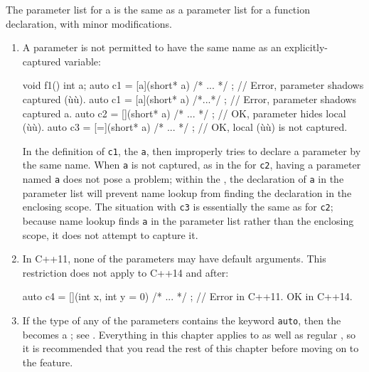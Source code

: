 \noindent The parameter list for a  is the same as a
parameter list for a function declaration, with minor modifications.

\begin{enumerate}
\item{A parameter is not permitted to have the same name as an explicitly-captured variable:

\begin{emcppslisting}
void f1()
{
    int a;
    auto c1 = [a](short* a){ /* ... */ };  // Error, parameter shadows captured (ù{}ù).
    auto c1 = [a](short* a){ /*...*/ };  // Error, parameter shadows captured a.
    auto c2 = [](short* a){ /* ... */ };   // OK, parameter hides local (ù{}ù).
    auto c3 = [=](short* a){ /* ... */ };  // OK, local (ù{}ù) is not captured.
}
\end{emcppslisting}

\noindent In the definition of \lstinline!c1!, the 
 \lstinline!a!, then improperly tries to
declare a parameter by the same name. When \lstinline!a! is not captured,
as in the  for \lstinline!c2!, having a parameter
named \lstinline!a! does not pose a problem; within the , the declaration of \lstinline!a! in the parameter list will prevent
name lookup from finding the declaration in the enclosing scope. The
situation with \lstinline!c3! is essentially the same as for \lstinline!c2!;
because name lookup finds \lstinline!a! in the parameter list rather than
the enclosing scope, it does not attempt to capture it.}

\item{In C++11, none of the parameters may have default arguments. This restriction does not apply to C++14 and after:

\begin{emcppslisting}
auto c4 = [](int x, int y = 0){ /* ... */ };  // Error in C++11.  OK in C++14.
\end{emcppslisting}
}

\item{If the type of any of the parameters contains the keyword \lstinline!auto!, then the  becomes a ; see . Everything in this chapter applies to  as well as regular , so it is recommended that you read the rest of this chapter before moving on to the  feature.}
\end{enumerate}

